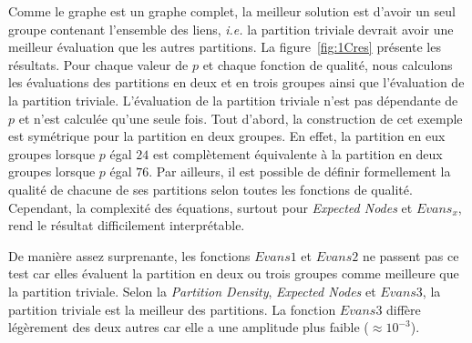 Comme le graphe est un graphe complet, la meilleur solution est d'avoir un seul groupe contenant l'ensemble des liens, \textit{i.e.} la partition triviale devrait avoir une meilleur évaluation que les autres partitions.
La figure~\ref{fig:1Cres} présente les résultats.
Pour chaque valeur de $p$ et chaque fonction de qualité, nous calculons les évaluations des partitions en deux et en trois groupes ainsi que l'évaluation de la partition triviale.
L'évaluation de la partition triviale n'est pas dépendante de $p$ et n'est calculée qu'une seule fois.
Tout d'abord, la construction de cet exemple est symétrique pour la partition en deux groupes.
En effet, la partition en eux groupes lorsque $p$ égal $24$ est complètement équivalente à la partition en deux groupes lorsque $p$ égal $76$.
Par ailleurs, il est possible de définir formellement la qualité de  chacune de ses partitions selon toutes les fonctions de qualité.
Cependant, la complexité des équations, surtout pour \emph{Expected Nodes} et $Evans_x$, rend le résultat difficilement interprétable.


De manière assez surprenante, les fonctions $Evans1$ et $Evans2$ ne passent pas ce test car elles évaluent la partition en deux ou trois groupes comme meilleure que la partition triviale.
Selon la \emph{Partition Density}, \emph{Expected Nodes} et $Evans3$, la partition triviale est la meilleur des partitions.
La fonction $Evans3$ diffère légèrement des deux autres car elle a une amplitude plus faible ($\approx 10^{-3}$).


